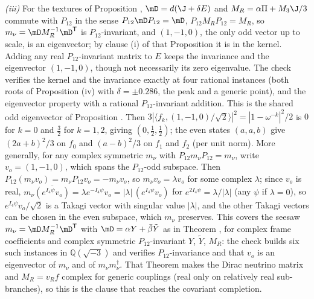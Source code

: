 \emph{(iii)} For the textures of Proposition , $\mD = d(\J + \delta E)$ and $M_{R} = \alpha\Pi + M_{3}\J/3$ commute with $P_{12}$ in the sense $P_{12}\mD P_{12} = \mD$, $P_{12}M_{R}P_{12} = M_{R}$, so $m_{\nu} = \mD M_{R}^{-1}\mD^{\mathsf{T}}$ is $P_{12}$-invariant, and $(1, -1, 0)$, the only odd vector up to scale, is an eigenvector; by clause (i) of that Proposition it is in the kernel. Adding any real $P_{12}$-invariant matrix to $E$ keeps the invariance and the eigenvector $(1, -1, 0)$, though not necessarily its zero eigenvalue. The check verifies the kernel and the invariance exactly at four rational instances (both roots of Proposition (iv) with $\delta = \pm 0.286$, the peak and a generic point), and the eigenvector property with a rational $P_{12}$-invariant addition. This is the shared odd eigenvector of Proposition . Then $3|\langle f_{k}, (1, -1, 0)/\sqrt2\rangle|^{2} = |1 - \omega^{-k}|^{2}/2$ is $0$ for $k = 0$ and $\tfrac32$ for $k = 1, 2$, giving $(0, \tfrac12, \tfrac12)$; the even states $(a, a, b)$ give $(2a + b)^{2}/3$ on $f_{0}$ and $(a - b)^{2}/3$ on $f_{1}$ and $f_{2}$ (per unit norm). More generally, for any complex symmetric $m_{\nu}$ with $P_{12}m_{\nu}P_{12} = m_{\nu}$, write $v_{o} = (1, -1, 0)$, which spans the $P_{12}$-odd subspace. Then $P_{12}(m_{\nu}v_{o}) = m_{\nu}P_{12}v_{o} = -m_{\nu}v_{o}$, so $m_{\nu}v_{o} = \lambda v_{o}$ for some complex $\lambda$; since $v_{o}$ is real, $m_{\nu}\overline{(e^{I_{4}\psi}v_{o})} = \lambda e^{-I_{4}\psi}v_{o} = |\lambda|\,(e^{I_{4}\psi}v_{o})$ for $e^{2I_{4}\psi} = \lambda/|\lambda|$ (any $\psi$ if $\lambda = 0$), so $e^{I_{4}\psi}v_{o}/\sqrt2$ is a Takagi vector with singular value $|\lambda|$, and the other Takagi vectors can be chosen in the even subspace, which $m_{\nu}$ preserves. This covers the seesaw $m_{\nu} = \mD M_{R}^{-1}\mD^{\mathsf{T}}$ with $\mD = \alpha Y + \bar{\beta}\tilde{Y}$ as in Theorem , for complex frame coefficients and complex symmetric $P_{12}$-invariant $Y$, $\tilde{Y}$, $M_{R}$: the check builds six such instances in $\mathbb{Q}(\sqrt{-3})$ and verifies $P_{12}$-invariance and that $v_{o}$ is an eigenvector of $m_{\nu}$ and of $m_{\nu}m_{\nu}^{\dagger}$. That Theorem makes the Dirac neutrino matrix and $M_{R} = v_{R}f$ complex for generic couplings (real only on relatively real sub-branches), so this is the clause that reaches the covariant completion.

